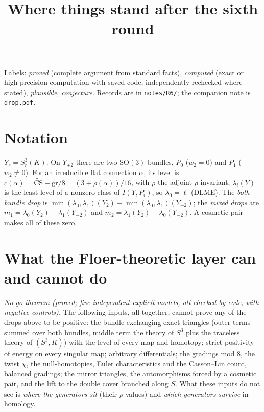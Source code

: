 \documentclass[10pt]{amsart}
\title{Where things stand after the sixth round}
\date{}
\numberwithin{equation}{section}
\newcommand{\st}[1]{\par\noindent\textit{#1}\enspace}
\newcommand{\SO}{\mathrm{SO}}
\begin{document}
\maketitle
\vspace{-2.5em}

\noindent Labels: \emph{proved} (complete argument from standard facts),
\emph{computed} (exact or high-precision computation with saved code,
independently rechecked where stated), \emph{plausible}, \emph{conjecture}.
Records are in \texttt{notes/R6/}; the companion note is \texttt{drop.pdf}.

\section{Notation}

$Y_r=S^3_r(K)$. On $Y_{\pm2}$ there are two $\SO(3)$-bundles, $P_0$
($w_2=0$) and $P_1$ ($w_2\ne0$). For an irreducible flat connection
$\alpha$, its level is $c(\alpha)=\widetilde{\mathrm{CS}}-\widetilde{\mathrm{gr}}/8
=(3+\rho(\alpha))/16$, with $\rho$ the adjoint $\rho$-invariant;
$\lambda_i(Y)$ is the least level of a nonzero class of $I(Y,P_i)$, so
$\lambda_0=\ell$ (DLME). The \emph{both-bundle drop} is
$\min(\lambda_0,\lambda_1)(Y_2)-\min(\lambda_0,\lambda_1)(Y_{-2})$; the
\emph{mixed drops} are $m_1=\lambda_0(Y_2)-\lambda_1(Y_{-2})$ and
$m_2=\lambda_1(Y_2)-\lambda_0(Y_{-2})$. A cosmetic pair makes all of these
zero.

\section{What the Floer-theoretic layer can and cannot do}

\st{No-go theorem (proved; five independent explicit models, all checked by
code, with negative controls).} The following inputs, all together, cannot
prove any of the drops above to be positive: the bundle-exchanging exact
triangles (outer terms summed over both bundles, middle term the theory of
$S^3$ plus the traceless theory of $(S^3,K)$) with the level of every map
and homotopy; strict positivity of energy on every singular map; arbitrary
differentials; the gradings mod $8$, the twist $\chi$, the null-homotopies,
Euler characteristics and the Casson--Lin count, balanced gradings; the
mirror triangles, the automorphisms forced by a cosmetic pair, and the lift
to the double cover branched along $S$. What these inputs do not see is
\emph{where the generators sit} (their $\rho$-values) and \emph{which
generators survive} in homology.
\end{document}
